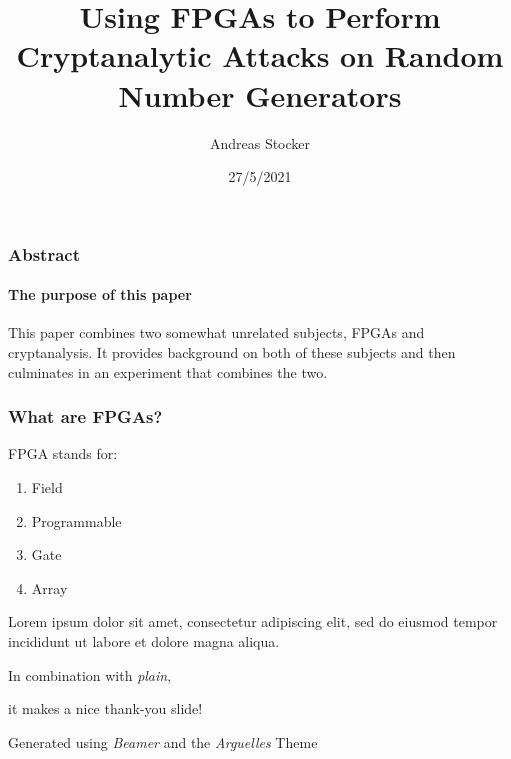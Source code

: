 \documentclass{beamer}
\title{Using FPGAs to Perform Cryptanalytic Attacks on Random Number Generators}
\subtitle{}
\date{27/5/2021}
\author{Andreas Stocker}
\institute{University of Nicosia\par\email{andreas@stockers.org}}
\begin{document}
  \frame[plain]{\titlepage}
  

  \begin{frame}
    \frametitle{Abstract}
    \framesubtitle{The purpose of this paper}

    This paper combines two somewhat unrelated subjects, FPGAs and cryptanalysis.
    It provides background on both of these subjects and then culminates
    in an experiment that combines the two.
  \end{frame}


  \begin{frame}
    \frametitle{What are FPGAs?}
    
    \vfill
    
    \AlegreyaExtraBold FPGA \ttfamily stands for:
    \begin{enumerate}
      \item Field
      \item Programmable
      \item Gate
      \item Array
    \end{enumerate}
    
    \vfill
    
    Lorem ipsum dolor sit amet, consectetur adipiscing elit, sed do eiusmod tempor incididunt ut labore et dolore magna aliqua.\par
    
  \end{frame}
   
  \ThankYou
  \begin{frame}
    In combination with \textit{plain},\par
    it makes a nice thank-you slide!

    \vfill{Generated using \textit{Beamer} and the \textit{Arguelles} Theme}
  \end{frame}
\end{document}
